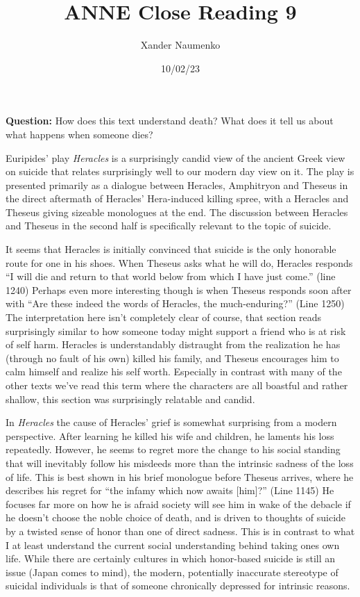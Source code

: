 \documentclass[letterpaper, reqno,11pt]{article}
\begin{document}
\title{ANNE Close Reading 9}
\date{10/02/23}
\author{Xander Naumenko}
\maketitle

{\bf Question:} How does this text understand death? What does it tell us about what happens when someone dies?

\medskip

Euripides' play {\em Heracles} is a surprisingly candid view of the ancient Greek view on suicide that relates surprisingly well to our modern day view on it. The play is presented primarily as a dialogue between Heracles, Amphitryon and Theseus in the direct aftermath of Heracles' Hera-induced killing spree, with a Heracles and Theseus giving sizeable monologues at the end. The discussion between Heracles and Theseus in the second half is specifically relevant to the topic of suicide.

\medskip

It seems that Heracles is initially convinced that suicide is the only honorable route for one in his shoes. When Theseus asks what he will do, Heracles responds ``I will die and return to that world below from which I have just come.'' (line 1240) Perhaps even more interesting though is when Theseus responds soon after with ``Are these indeed the words of Heracles, the much-enduring?'' (Line 1250) The interpretation here isn't completely clear of course, that section reads surprisingly similar to how someone today might support a friend who is at risk of self harm. Heracles is understandably distraught from the realization he has (through no fault of his own) killed his family, and Theseus encourages him to calm himself and realize his self worth. Especially in contrast with many of the other texts we've read this term where the characters are all boastful and rather shallow, this section was surprisingly relatable and candid.

\medskip

In {\em Heracles} the cause of Heracles' grief is somewhat surprising from a modern perspective. After learning he killed his wife and children, he laments his loss repeatedly. However, he seems to regret more the change to his social standing that will inevitably follow his misdeeds more than the intrinsic sadness of the loss of life. This is best shown in his brief monologue before Theseus arrives, where he describes his regret for ``the infamy which now awaits [him]?'' (Line 1145) He focuses far more on how he is afraid society will see him in wake of the debacle if he doesn't choose the noble choice of death, and is driven to thoughts of suicide by a twisted sense of honor than one of direct sadness. This is in contrast to what I at least understand the current social understanding behind taking ones own life. While there are certainly cultures in which honor-based suicide is still an issue (Japan comes to mind), the modern, potentially inaccurate stereotype of suicidal individuals is that of someone chronically depressed for intrinsic reasons. 
\end{document}
